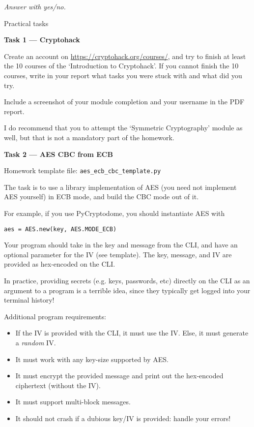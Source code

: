 \documentclass{practice}
\begin{document}
\textit{Answer with yes/no.}

\newpage

\begin{center}
  Practical tasks
\end{center}

\textbf{Task 1 --- Cryptohack}

Create an account on \url{https://cryptohack.org/courses/}, and try to finish at least the 10 courses of the `Introduction to Cryptohack'.
If you cannot finish the 10 courses, write in your report what tasks you were stuck with and what did you try.

Include a screenshot of your module completion and your username in the PDF report.

I do recommend that you to attempt the `Symmetric Cryptography' module as well, but that is not a mandatory part of the homework.

\textbf{Task 2 --- AES CBC from ECB}

Homework template file: \texttt{aes\_ecb\_cbc\_template.py}

The task is to use a library implementation of AES (you need not implement AES yourself) in ECB mode, and build the CBC mode out of it.

For example, if you use PyCryptodome, you should instantiate AES with
\begin{center}
  \texttt{aes = AES.new(key, AES.MODE\_ECB)}
\end{center}

Your program should take in the key and message from the CLI, and have an optional parameter for the IV (see template).
The key, message, and IV are provided as hex-encoded on the CLI.

\begin{tcolorbox}[title=Note]
  In practice, providing secrets (e.g. keys, passwords, etc) directly on the CLI as an argument to a program is a terrible idea, since they typically get logged into your terminal history!
\end{tcolorbox}

Additional program requirements:
\begin{itemize}
  \item If the IV is provided with the CLI, it must use the IV. Else, it must generate a \emph{random} IV.
  \item It must work with any key-size supported by AES.
  \item It must encrypt the provided message and print out the hex-encoded ciphertext (without the IV).
  \item It must support multi-block messages.
  \item It should not crash if a dubious key/IV is provided: handle your errors!
\end{itemize}
\end{document}
